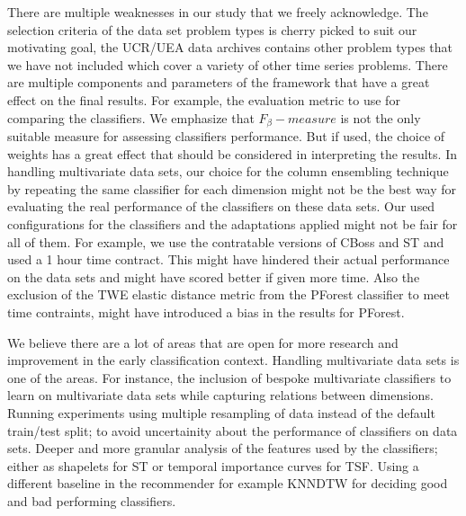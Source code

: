 There are multiple weaknesses in our study that we freely acknowledge.
The selection criteria of the data set problem types is cherry picked to suit our motivating goal, the UCR/UEA data archives contains other problem types that we have not
included which cover a variety of other time series problems.
There are multiple components and parameters of the framework that have a great effect on the final results.
For example, the evaluation metric to use for comparing the classifiers.
We emphasize that $F_{\beta}-measure$ is not the only suitable measure for assessing classifiers performance.
But if used, the choice of weights has a great effect that should be considered in interpreting the results.
In handling multivariate data sets, our choice for the column ensembling technique by repeating the same classifier for each dimension
might not be the best way for evaluating the real performance of the classifiers on these data sets.
Our used configurations for the classifiers and the adaptations applied might not be fair for all of them.
For example, we use the contratable versions of CBoss and ST and used a 1 hour time contract.
This might have hindered their actual performance on the data sets and might have scored better if given more time.
Also the exclusion of the TWE elastic distance metric from the PForest classifier to meet time contraints,
might have introduced a bias in the results for PForest.

We believe there are a lot of areas that are open for more research and improvement in the early classification context.
Handling multivariate data sets is one of the areas.
For instance, the inclusion of bespoke multivariate classifiers to learn on multivariate data sets while capturing relations between dimensions.
Running experiments using multiple resampling of data instead of the default train/test split; to avoid uncertainity about the performance of classifiers on data sets.
Deeper and more granular analysis of the features used by the classifiers; either as shapelets for ST or temporal importance curves for TSF.
Using a different baseline in the recommender for example KNNDTW for deciding good and bad performing classifiers.